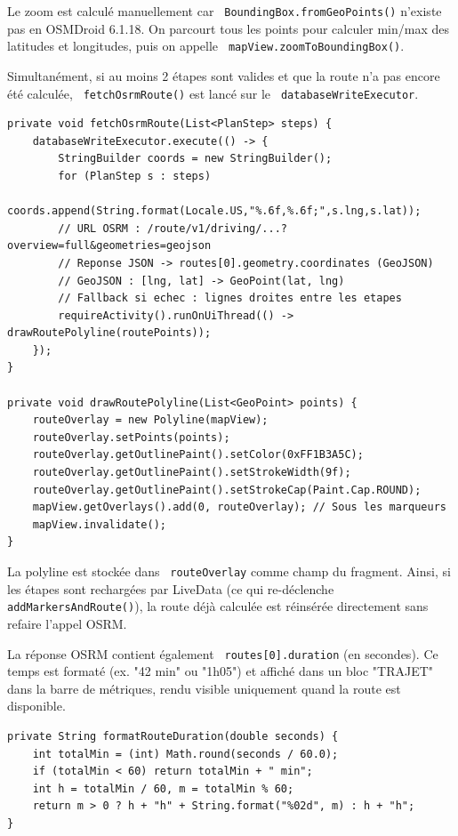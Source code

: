 \documentclass[a4paper,12pt,openany]{report}
\newcommand{\ic}[1]{\texttt{\small\colorbox{lightbg}{\color{navy!90} #1}}}
\begin{document}
Le zoom est calculé manuellement car \ic{BoundingBox.fromGeoPoints()} n'existe
pas en OSMDroid 6.1.18. On parcourt tous les points pour calculer min/max des
latitudes et longitudes, puis on appelle \ic{mapView.zoomToBoundingBox()}.

Simultanément, si au moins 2 étapes sont valides et que la route n'a pas encore
été calculée, \ic{fetchOsrmRoute()} est lancé sur le \ic{databaseWriteExecutor}.

\begin{lstlisting}
private void fetchOsrmRoute(List<PlanStep> steps) {
    databaseWriteExecutor.execute(() -> {
        StringBuilder coords = new StringBuilder();
        for (PlanStep s : steps)
            coords.append(String.format(Locale.US,"%.6f,%.6f;",s.lng,s.lat));
        // URL OSRM : /route/v1/driving/...?overview=full&geometries=geojson
        // Reponse JSON -> routes[0].geometry.coordinates (GeoJSON)
        // GeoJSON : [lng, lat] -> GeoPoint(lat, lng)
        // Fallback si echec : lignes droites entre les etapes
        requireActivity().runOnUiThread(() -> drawRoutePolyline(routePoints));
    });
}

private void drawRoutePolyline(List<GeoPoint> points) {
    routeOverlay = new Polyline(mapView);
    routeOverlay.setPoints(points);
    routeOverlay.getOutlinePaint().setColor(0xFF1B3A5C);
    routeOverlay.getOutlinePaint().setStrokeWidth(9f);
    routeOverlay.getOutlinePaint().setStrokeCap(Paint.Cap.ROUND);
    mapView.getOverlays().add(0, routeOverlay); // Sous les marqueurs
    mapView.invalidate();
}
\end{lstlisting}

La polyline est stockée dans \ic{routeOverlay} comme champ du fragment. Ainsi,
si les étapes sont rechargées par LiveData (ce qui re-déclenche
\ic{addMarkersAndRoute()}), la route déjà calculée est réinsérée directement
sans refaire l'appel OSRM.

La réponse OSRM contient également \ic{routes[0].duration} (en secondes).
Ce temps est formaté (ex. "42 min" ou "1h05") et affiché dans un bloc
"TRAJET" dans la barre de métriques, rendu visible uniquement quand la route
est disponible.

\begin{lstlisting}
private String formatRouteDuration(double seconds) {
    int totalMin = (int) Math.round(seconds / 60.0);
    if (totalMin < 60) return totalMin + " min";
    int h = totalMin / 60, m = totalMin % 60;
    return m > 0 ? h + "h" + String.format("%02d", m) : h + "h";
}
\end{lstlisting}
\end{document}
